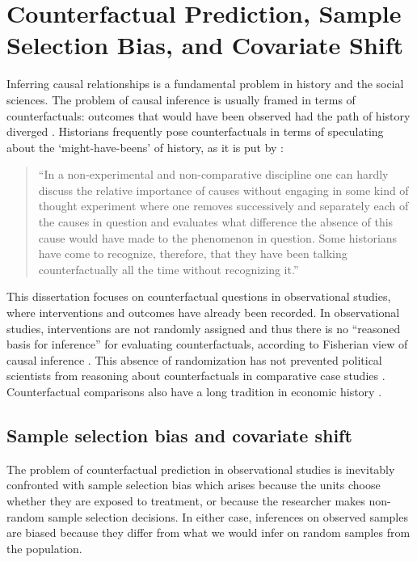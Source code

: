 \chapter{Counterfactual Prediction, Sample Selection Bias, and Covariate Shift} \label{counterfactual-history}

Inferring causal relationships is a fundamental problem in history and the social sciences. The problem of causal inference is usually framed in terms of counterfactuals: outcomes that would have been observed had the path of history diverged \citep{lewis2013counterfactuals,pearl2009causality,imbens2015causal}. Historians frequently pose counterfactuals in terms of speculating about the `might-have-beens' of history, as it is put by  \citet{elster1978logic}:

\begin{quote}
``In a non-experimental and non-comparative discipline one can hardly discuss the
relative importance of causes without engaging in some kind of thought experiment where one removes successively and separately each of the causes in
question and evaluates what difference the absence of this cause would have
made to the phenomenon in question. Some historians have come to recognize,
therefore, that they have been talking counterfactually all the time without
recognizing it.''
\end{quote}

This dissertation focuses on counterfactual questions in observational studies, where interventions and outcomes have already been recorded. In observational studies, interventions are not randomly assigned and thus there is no ``reasoned basis for inference'' for evaluating counterfactuals, according to Fisherian view of causal inference \citep{fisher1935}. This absence of randomization has not prevented political scientists from reasoning about counterfactuals in comparative case studies \citep{fearon1991counterfactuals, tetlock1996counterfactual,abadie2010synthetic,abadie2015comparative}. Counterfactual comparisons also have a long tradition in economic history \citep{fogel1964railroads,donaldson2016railroads}.

\section{Sample selection bias and covariate shift}

The problem of counterfactual prediction in observational studies is inevitably confronted with sample selection bias \citep{heckman1979sample} which arises because the units choose whether they are exposed to treatment, or because the researcher makes non-random sample selection decisions. In either case, inferences on observed samples are biased because they differ from what we would infer on random samples from the population. 

